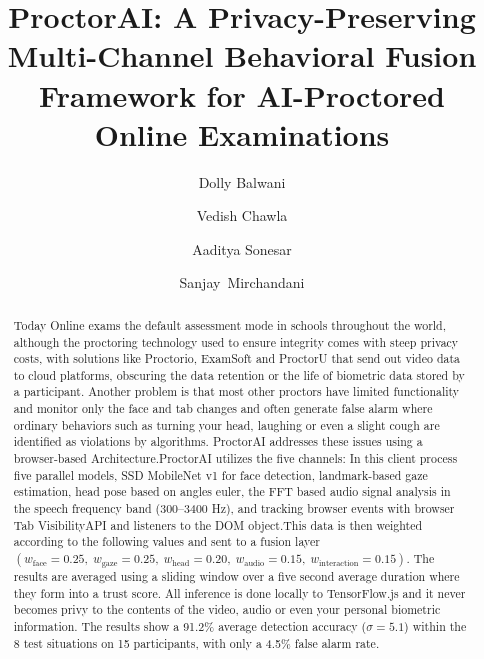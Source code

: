 \documentclass[runningheads]{llncs}
\begin{document}
\title{ProctorAI: A Privacy-Preserving Multi-Channel Behavioral Fusion Framework for AI-Proctored Online Examinations}


\author{Dolly Balwani \and
Vedish Chawla \and
Aaditya Sonesar \and
\mbox{Sanjay Mirchandani}}



\maketitle

\begin{abstract}
Today Online exams the default assessment mode in schools throughout the world, although the proctoring technology used to ensure integrity comes with steep privacy costs, with solutions like Proctorio, ExamSoft and ProctorU that send out video data to cloud platforms, obscuring the data retention or the life of biometric data stored by a participant. Another problem is that most other proctors have limited functionality and monitor only the face and tab changes and often generate false alarm where ordinary behaviors such as turning your head, laughing or even a slight cough are identified as violations by algorithms. ProctorAI addresses these issues using a browser-based Architecture.ProctorAI utilizes the five channels: In this client process five parallel models, SSD MobileNet v1 for face detection, landmark-based gaze estimation, head pose based on angles euler, the FFT based audio signal analysis in the speech frequency band (300--3400 Hz), and tracking browser events with browser Tab VisibilityAPI and listeners to the DOM object.This data is then weighted according to the following values and sent to a fusion layer $(w_{\text{face}} = 0.25,\; w_{\text{gaze}} = 0.25,\; w_{\text{head}} = 0.20,\; w_{\text{audio}} = 0.15,\; w_{\text{interaction}} = 0.15)$. The results are averaged using a sliding window over a five second average duration where they form into a trust score. All inference is done locally to TensorFlow.js and it never becomes privy to the contents of the video, audio or even your personal biometric information. The results show a 91.2\% average detection accuracy ($\sigma = 5.1$) within the 8 test situations on 15 participants, with only a 4.5\% false alarm rate.

\end{abstract}
\end{document}
